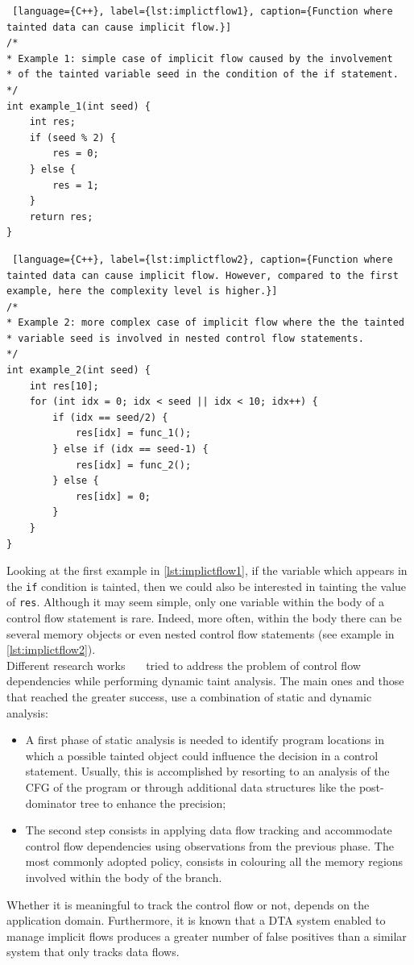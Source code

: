 \documentclass[LaM,binding=0.6cm]{sapthesis}
\begin{document}
\begin{lstlisting} [language={C++}, label={lst:implictflow1}, caption={Function where tainted data can cause implicit flow.}]
/*
* Example 1: simple case of implicit flow caused by the involvement
* of the tainted variable seed in the condition of the if statement.
*/
int example_1(int seed) {
	int res;
	if (seed % 2) {
		res = 0;
	} else {
		res = 1;
	}
	return res;
}
\end{lstlisting}
\clearpage
\begin{lstlisting} [language={C++}, label={lst:implictflow2}, caption={Function where tainted data can cause implicit flow. However, compared to the first example, here the complexity level is higher.}]
/*
* Example 2: more complex case of implicit flow where the the tainted
* variable seed is involved in nested control flow statements.
*/
int example_2(int seed) {
	int res[10];
	for (int idx = 0; idx < seed || idx < 10; idx++) {
		if (idx == seed/2) {
			res[idx] = func_1();
		} else if (idx == seed-1) {
			res[idx] = func_2();
		} else {
			res[idx] = 0;
		}	
	}
}
\end{lstlisting}

Looking at the first example in \ref{lst:implictflow1}, if the variable which appears in the \texttt{if} condition is tainted, then we could also be interested in tainting the value of \texttt{res}. Although it may seem simple, only one variable within the body of a control flow statement is rare. Indeed, more often, within the body there can be several memory objects or even nested control flow statements (see example in \ref{lst:implictflow2}).\\
Different research works~\cite{graa2012detecting}~\cite{clause2007dytan}~\cite{chen2011dynamic} tried to address the problem of control flow dependencies while performing dynamic taint analysis. The main ones and those that reached the greater success, use a combination of static and dynamic analysis:
\begin{itemize}
\item A first phase of static analysis is needed to identify program locations in which a possible tainted object could influence the decision in a control statement. Usually, this is accomplished by resorting to an analysis of the CFG of the program or through additional data structures like the post-dominator tree to enhance the precision;
\item The second step consists in applying data flow tracking and accommodate control flow dependencies using observations from the previous phase. The most commonly adopted policy, consists in colouring all the memory regions involved within the body of the branch.
\end{itemize}
Whether it is meaningful to track the control flow or not, depends on the application domain. Furthermore, it is known that a DTA system enabled to manage implicit flows produces a greater number of false positives than a similar system that only tracks data flows.\\
\end{document}
